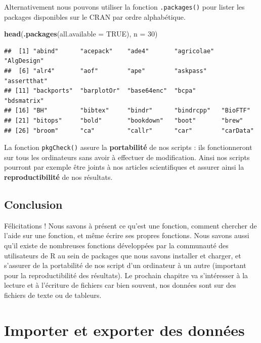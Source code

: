 \documentclass[
]{book}
\newenvironment{Shaded}{\begin{snugshade}}{\end{snugshade}}
\newcommand{\DataTypeTok}[1]{\textcolor[rgb]{0.13,0.29,0.53}{#1}}
\newcommand{\DecValTok}[1]{\textcolor[rgb]{0.00,0.00,0.81}{#1}}
\newcommand{\KeywordTok}[1]{\textcolor[rgb]{0.13,0.29,0.53}{\textbf{#1}}}
\newcommand{\NormalTok}[1]{#1}
\newcommand{\OtherTok}[1]{\textcolor[rgb]{0.56,0.35,0.01}{#1}}
\begin{document}
Alternativement nous pouvons utiliser la fonction \texttt{.packages()} pour lister les packages disponibles sur le CRAN par ordre alphabétique.

\begin{Shaded}
\begin{Highlighting}[]
\KeywordTok{head}\NormalTok{(}\KeywordTok{.packages}\NormalTok{(}\DataTypeTok{all.available =} \OtherTok{TRUE}\NormalTok{), }\DataTypeTok{n =} \DecValTok{30}\NormalTok{)}
\end{Highlighting}
\end{Shaded}

\begin{verbatim}
##  [1] "abind"      "acepack"    "ade4"       "agricolae"  "AlgDesign" 
##  [6] "alr4"       "aof"        "ape"        "askpass"    "assertthat"
## [11] "backports"  "barplotOr"  "base64enc"  "bcpa"       "bdsmatrix" 
## [16] "BH"         "bibtex"     "bindr"      "bindrcpp"   "BioFTF"    
## [21] "bitops"     "bold"       "bookdown"   "boot"       "brew"      
## [26] "broom"      "ca"         "callr"      "car"        "carData"
\end{verbatim}

La fonction \texttt{pkgCheck()} assure la \textbf{portabilité} de nos scripts : ils fonctionneront sur tous les ordinateurs sans avoir à effectuer de modification. Ainsi nos scripts pourront par exemple être joints à nos articles scientifiques et assurer ainsi la \textbf{reproductibilité} de nos résultats.

\hypertarget{conclusion-4}{%
\section{Conclusion}\label{conclusion-4}}

Félicitations ! Nous savons à présent ce qu'est une fonction, comment chercher de l'aide sur une fonction, et même écrire ses propres fonctions. Nous savons aussi qu'il existe de nombreuses fonctions développées par la communauté des utilisateurs de R au sein de packages que nous savons installer et charger, et s'assurer de la portabilité de nos script d'un ordinateur à un autre (important pour la reproductibilité des résultats). Le prochain chapitre va s'intéresser à la lecture et à l'écriture de fichiers car bien souvent, nos données sont sur des fichiers de texte ou de tableurs.

\hypertarget{import}{%
\chapter{Importer et exporter des données}\label{import}}
\end{document}
